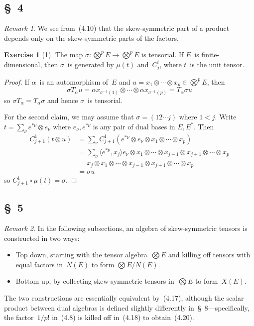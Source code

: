 \documentclass[letterpaper,12pt]{article}
\newcommand{\after}{\circ}
\newcommand{\tprod}{\otimes}
\newcommand{\bigtprod}{\bigotimes}
\newcommand{\medtprod}{{\textstyle\bigtprod}}
\newcommand{\sprod}[2]{\langle#1,#2\rangle}
\newcommand{\multi}[4]{#2_{#3}#1\cdots#1#2_{#4}}
\newcommand{\tprods}[3]{\multi{\tprod}{#1}{#2}{#3}}
\theoremstyle{definition}
\newtheorem*{exer}{Exercise}
\theoremstyle{remark}
\newtheorem*{rmk}{Remark}
\begin{document}
\subsection*{\S~4}
\begin{rmk}
We see from~(4.10) that the skew-symmetric part of a product depends only on the skew-symmetric parts of the factors.
\end{rmk}

\begin{exer}[1]
The map \(\sigma:\medtprod^p E\to\medtprod^p E\) is tensorial. If \(E\)~is finite-dimensional, then \(\sigma\)~is generated by \(\mu(t)\) and~\(C^i_j\), where \(t\)~is the unit tensor.
\end{exer}
\begin{proof}
If \(\alpha\)~is an automorphism of~\(E\) and \(u=\tprods{x}{1}{p}\in\medtprod^p E\), then
\[\sigma T_{\alpha}u=\tprods{\alpha x}{\sigma^{-1}(1)}{\sigma^{-1}(p)}=T_{\alpha}\sigma u\]
so \(\sigma T_{\alpha}=T_{\alpha}\sigma\) and hence \(\sigma\)~is tensorial.

For the second claim, we may assume that \(\sigma=(12\cdots j)\) where \(1<j\). Write \(t=\sum_{\nu}e^{*\nu}\tprod e_{\nu}\) where \(e_{\nu},e^{*\nu}\) is any pair of dual bases in \(E,E^*\). Then
\begin{align*}
C^1_{j+1}(t\tprod u)&=\sum_{\nu}C^1_{j+1}(e^{*\nu}\tprod e_{\nu}\tprod\tprods{x}{1}{p})\\
	&=\sum_{\nu}\sprod{e^{*\nu}}{x_j}e_{\nu}\tprod\tprods{x}{1}{j-1}\tprod\tprods{x}{j+1}{p}\\
	&=x_j\tprod\tprods{x}{1}{j-1}\tprod\tprods{x}{j+1}{p}\\
	&=\sigma u
\end{align*}
so \(C^1_{j+1}\after\mu(t)=\sigma\).
\end{proof}

\subsection*{\S~5}
\begin{rmk}
In the following subsections, an algebra of skew-symmetric tensors is constructed in two ways:
\begin{itemize}
\item Top down, starting with the tensor algebra~\(\medtprod E\) and killing off tensors with equal factors in~\(N(E)\) to form \(\medtprod E/N(E)\).
\item Bottom up, by collecting skew-symmetric tensors in~\(\medtprod E\) to form~\(X(E)\).
\end{itemize}
The two constructions are essentially equivalent by~(4.17), although the scalar product between dual algebras is defined slightly differently in~\S~8---specifically, the factor~\(1/p!\) in~(4.8) is killed off in~(4.18) to obtain~(4.20).
\end{rmk}
\end{document}

